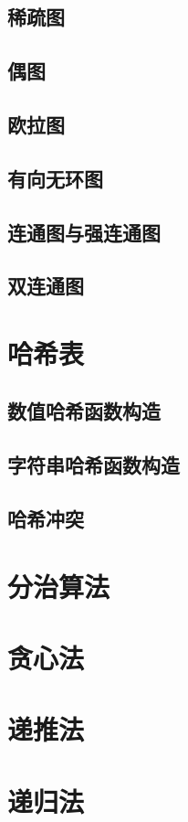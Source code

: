 \documentclass[12pt,twiside,a4paper]{ctexbook}
\numberwithin{chapter}{part}
\begin{document}
\section{稀疏图}
\section{偶图}
\section{欧拉图}
\section{有向无环图}
\section{连通图与强连通图}
\section{双连通图}

\chapter{哈希表}
\section{数值哈希函数构造}
\section{字符串哈希函数构造}
\section{哈希冲突}

\chapter{分治算法}

\chapter{贪心法}

\chapter{递推法}

\chapter{递归法}
\end{document}
